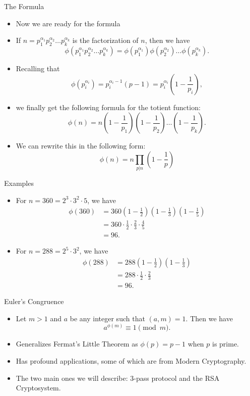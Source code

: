 \documentclass[ %
 usenames,dvipsnames,
aspectratio=169,11pt ]{beamer}
\newenvironment{stepitemize}{\begin{itemize}[<+->]}{\end{itemize} }
\begin{document}
\begin{frame}{The Formula}
\begin{stepitemize}
    \item Now we are ready for the formula
    \item If $n=p_1^{\alpha_1}p_2^{\alpha_2}\dots p_k^{\alpha_k}$ is the factorization of $n$, then we have
    $$\phi(p_1^{\alpha_1}p_2^{\alpha_2} \dots p_k^{\alpha_k}) = \phi(p_1^{\alpha_1})\phi(p_2^{\alpha_2}) \dots \phi(p_k^{\alpha_k}).$$
\item Recalling that $$\phi(p_i^{\alpha_i})=p_i^{\alpha_i-1}(p-1)=p_i^{\alpha_i}\left (1-\frac{1}{p_i}\right ),$$
\item we finally get the following formula for the totient function:
$$\phi(n) = n\left(1-\frac{1}{p_1}\right)\left(1-\frac{1}{p_2}\right)\dots \left(1-\frac{1}{p_k}\right).$$
\item We can rewrite this in the following form:
$$\phi(n)= n\prod_{p|n}\left(1-\frac{1}{p}\right)$$
\end{stepitemize}
\end{frame}

\begin{frame}{Examples}
\begin{stepitemize}
\item For $n=360=2^3\cdot 3^2\cdot 5$, we have
\begin{align*}
\phi(360) &= 360\left(1-\frac{1}{2}\right)\left(1-\frac{1}{3}\right)\left(1-\frac{1}{5}\right) \\
&=360\cdot \frac{1}{2}\cdot \frac{2}{3} \cdot \frac{4}{5} \\
&=96.
\end{align*}

\item For $n=288=2^5\cdot 3^2$, we have
\begin{align*}
\phi(288) &= 288\left(1-\frac{1}{2}\right)\left(1-\frac{1}{3}\right) \\
&=288\cdot \frac{1}{2}\cdot \frac{2}{3}\\
&=96.
\end{align*}
\end{stepitemize}
\end{frame}

\begin{frame}{Euler's Congruence}
    \begin{stepitemize}
    \item Let $m>1$ and $a$ be any integer such that $(a,m) =1$. Then we have
$$a^{\phi(m)} \equiv 1 \pmod{m}.$$
\item Generalizes Fermat's Little Theorem as $\phi(p)=p-1$ when $p$ is prime.
\item Has profound applications, some of which are from Modern Cryptography.
\item The two main ones we will describe: $3$-pass protocol and the RSA Cryptosystem.
    \end{stepitemize}
\end{frame}
\end{document}
